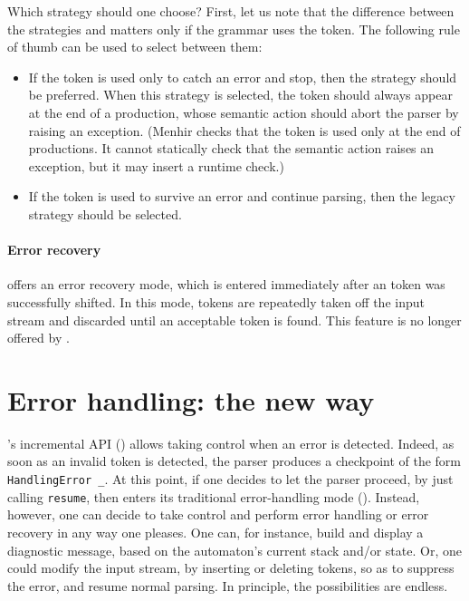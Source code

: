 \documentclass[onecolumn,11pt,nocopyrightspace,preprint]{sigplanconf}
\begin{document}
Which strategy should one choose? First, let us note that the difference
between the strategies \legacy and \simplified matters only if the grammar
uses the \error token. The following rule of thumb can be used to select
between them:
\begin{itemize}
\item If the \error token is used only to catch an error and stop, then the
  \simplified strategy should be preferred. When this strategy is selected,
  the \error token should always appear at the end of a production, whose
  semantic action should abort the parser by raising an exception. (Menhir
  checks that the \error token is used only at the end of productions.
  It cannot statically check that the semantic action raises an exception,
  but it may insert a runtime check.)
\item If the \error token is used to survive an error and continue parsing,
  then the legacy strategy should be selected.
\end{itemize}

\paragraph{Error recovery}

\ocamlyacc offers an error recovery mode, which is entered immediately after
an \error token was successfully shifted. In this mode, tokens are repeatedly
taken off the input stream and discarded until an acceptable token is found.
This feature is no longer offered by \menhir.


\section{Error handling: the new way}
\label{sec:errors:new}

\menhir's incremental API () allows taking control when
an error is detected. Indeed, as soon as an invalid token is detected, the
parser produces a checkpoint of the form \verb+HandlingError _+. At this
point, if one decides to let the parser proceed, by just
calling \verb+resume+, then \menhir enters its traditional error-handling mode
(). Instead, however, one can decide to take control and
perform error handling or error recovery in any way one pleases. One can, for
instance, build and display a diagnostic message, based on the automaton's
current stack and/or state. Or, one could modify the input stream, by
inserting or deleting tokens, so as to suppress the error, and resume normal
parsing. In principle, the possibilities are endless.
\end{document}
